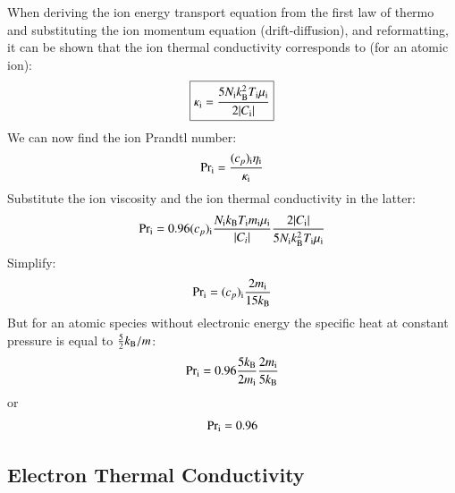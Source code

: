 \documentclass{warpdoc}
\newcommand\frameeqn[1]{\fbox{$\displaystyle #1$}}
\begin{document}
When deriving the ion energy transport equation from the first law of thermo and substituting the ion momentum equation (drift-diffusion), and reformatting, it can be shown that the ion thermal conductivity corresponds to (for an atomic ion):
%
\begin{equation}
\frameeqn{
 \kappa_{\rm i}=\frac{5 N_{\rm i} k_{\rm B}^2 T_{\rm i} \mu_{\rm i}}{2|C_{\rm i}|}
}
\end{equation}
%
We can now find the ion Prandtl number:
%
\begin{equation}
 {\rm Pr_i} = \frac{(c_p)_{\rm i} \eta_{\rm i}}{\kappa_{\rm i}}
\end{equation}
%
Substitute the ion viscosity and the ion thermal conductivity in the latter:
%
\begin{equation}
 {\rm Pr_i} = 0.96 (c_p)_{\rm i}  \frac{N_{\rm i} k_{\rm B} T_{\rm i} m_{\rm i} \mu_{\rm i}}{|C_i|} 
 \frac{2|C_{\rm i}|}{5 N_{\rm i} k_{\rm B}^2 T_{\rm i} \mu_{\rm i}}
\end{equation}
%
Simplify:
%
\begin{equation}
 {\rm Pr_i} = (c_p)_{\rm i}  
 \frac{2  m_{\rm i}}{15  k_{\rm B} }
\end{equation}
%
But for an atomic species without electronic energy the specific heat at constant pressure is equal to $\frac{5}{2}k_{\rm B}/m$:
%
\begin{equation}
 {\rm Pr_i} = 0.96 \frac{5 k_{\rm B}}{2 m_{\rm i}}
 \frac{2  m_{\rm i}}{5  k_{\rm B} }
\end{equation}
%
or
%
\begin{equation}
 {\rm Pr_i} = 0.96
\end{equation}
%



\subsection{Electron Thermal Conductivity}
\end{document}
